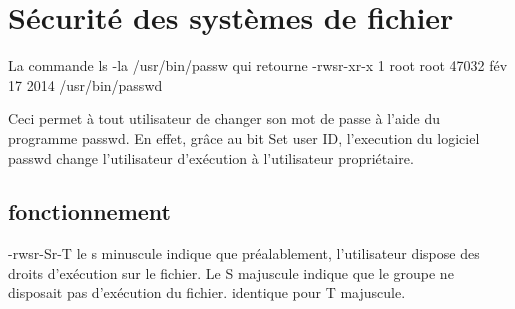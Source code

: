 \chapter{Sécurité des systèmes de fichier}
La commande ls -la /usr/bin/passw qui retourne
-rwsr-xr-x 1 root root 47032 fév 17  2014 /usr/bin/passwd

Ceci permet à tout utilisateur de changer son mot de passe à l'aide du programme passwd. En effet, grâce au bit Set user ID, l'execution du logiciel passwd change l'utilisateur d'exécution à l'utilisateur propriétaire.

\section{fonctionnement}
-rwsr-Sr-T
le s minuscule indique que préalablement, l'utilisateur dispose des droits d'exécution sur le fichier. Le S majuscule indique que le groupe ne disposait pas d'exécution du fichier. identique pour T majuscule.